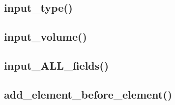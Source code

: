 \documentclass[12pt, a4paper]{article}
\begin{document}





\subsection{input\_type()}






\subsection{input\_volume()}






\subsection{input\_ALL\_fields()}






\subsection{add\_element\_before\_element()}


\end{document}
